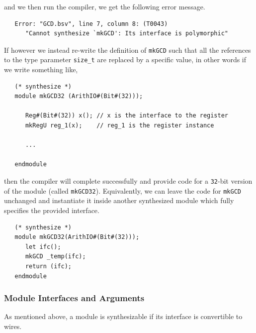 \documentclass[twoside,letterpaper]{article}
\begin{document}
and we then run the compiler, we get the following error message.

\begin{verbatim}
   Error: "GCD.bsv", line 7, column 8: (T0043)
      "Cannot synthesize `mkGCD': Its interface is polymorphic"     
\end{verbatim}

If however we instead re-write the
definition of \texttt{mkGCD} such that all the references to the type
parameter \texttt{size\_t} are replaced by a specific value, in other
words if we write something like,

\begin{verbatim}
   (* synthesize *)
   module mkGCD32 (ArithIO#(Bit#(32)));

      Reg#(Bit#(32)) x(); // x is the interface to the register
      mkRegU reg_1(x);    // reg_1 is the register instance

      ...

   endmodule
\end{verbatim}

then the compiler will complete successfully and provide code for a
\texttt{32}-bit version of the module (called \texttt{mkGCD32}). Equivalently, 
we can leave the code for \texttt{mkGCD} unchanged and instantiate it
inside another synthesized module which fully specifies the provided
interface.

\begin{verbatim}
   (* synthesize *)
   module mkGCD32(ArithIO#(Bit#(32)));
      let ifc();
      mkGCD _temp(ifc);
      return (ifc);
   endmodule
\end{verbatim}


\subsubsection{Module Interfaces and Arguments}
\label{sec-modargument}

As mentioned above, a module is synthesizable if its interface is
convertible  to wires. 
\end{document}

